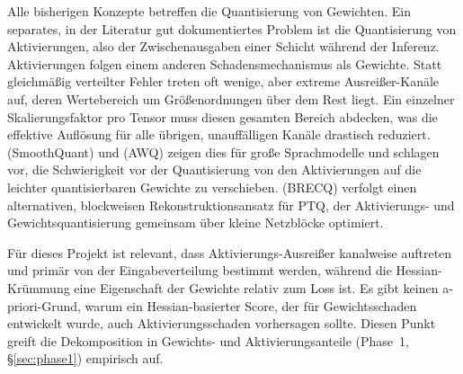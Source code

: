 Alle bisherigen Konzepte betreffen die Quantisierung von Gewichten. Ein separates, in der Literatur gut dokumentiertes Problem ist die Quantisierung von Aktivierungen, also der Zwischenausgaben einer Schicht während der Inferenz. Aktivierungen folgen einem anderen Schadensmechanismus als Gewichte. Statt gleichmäßig verteilter Fehler treten oft wenige, aber extreme Ausreißer-Kanäle auf, deren Wertebereich um Größenordnungen über dem Rest liegt. Ein einzelner Skalierungsfaktor pro Tensor muss diesen gesamten Bereich abdecken, was die effektive Auflösung für alle übrigen, unauffälligen Kanäle drastisch reduziert. \citet{xiao_smoothquant_2023} (SmoothQuant) und \citet{lin_awq_2024} (AWQ) zeigen dies für große Sprachmodelle und schlagen vor, die Schwierigkeit vor der Quantisierung von den Aktivierungen auf die leichter quantisierbaren Gewichte zu verschieben. \citet{li_brecq_2021} (BRECQ) verfolgt einen alternativen, blockweisen Rekonstruktionsansatz für PTQ, der Aktivierungs- und Gewichtsquantisierung gemeinsam über kleine Netzblöcke optimiert.
\par\medskip

Für dieses Projekt ist relevant, dass Aktivierungs-Ausreißer kanalweise auftreten und primär von der Eingabeverteilung bestimmt werden, während die Hessian-Krümmung eine Eigenschaft der Gewichte relativ zum Loss ist. Es gibt keinen a-priori-Grund, warum ein Hessian-basierter Score, der für Gewichtsschaden entwickelt wurde, auch Aktivierungsschaden vorhersagen sollte. Diesen Punkt greift die Dekomposition in Gewichts- und Aktivierungsanteile (Phase~1, \S\ref{sec:phase1}) empirisch auf.